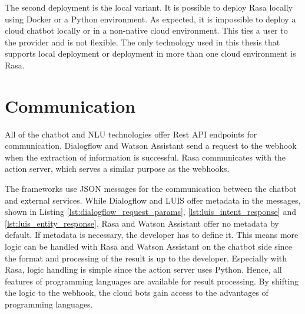The second deployment is the local variant.
It is possible to deploy Rasa locally using Docker or a Python environment.
As expected, it is impossible to deploy a cloud chatbot locally or in a non-native cloud environment.
This ties a user to the provider and is not flexible.
The only technology used in this thesis that supports local deployment or deployment in more than one cloud environment is Rasa. 

\section*{Communication}
All of the chatbot and NLU technologies offer Rest API endpoints for communication.
Dialogflow and Watson Assistant send a request to the webhook when the extraction of information is successful.
Rasa communicates with the action server, which serves a similar purpose as the webhooks.

The frameworks use JSON messages for the communication between the chatbot and external services.
While Dialogflow and LUIS offer metadata in the messages, shown in Listing \ref{lst:dialogflow_request_params}, \ref{lst:luis_intent_response}
and \ref{lst:luis_entity_response}, Rasa and Watson Assistant offer no metadata by default.
If metadata is necessary, the developer has to define it.
This means more logic can be handled with Rasa and Watson Assistant on the chatbot side since the format and processing of the result is up to the developer.
Especially with Rasa, logic handling is simple since the action server uses Python.
Hence, all features of programming languages are available for result processing.
By shifting the logic to the webhook, the cloud bots gain access to the advantages of programming languages. 

